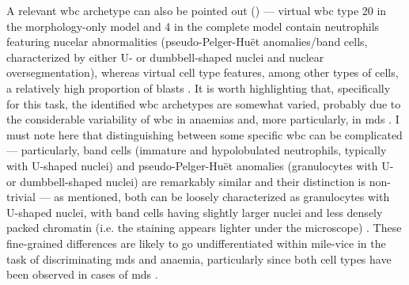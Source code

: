 \begin{figure}[!ht]
    \label{fig:mile-vice-vcq-so-disease-detection}
\end{figure}

\begin{figure}[!ht]
    \label{fig:rbc-disease-detection-examples}
\end{figure}

A relevant \ac{wbc} archetype can also be pointed out () --- virtual \ac{wbc} type 20 in the morphology-only model and 4 in the complete model contain neutrophils featuring nucelar abnormalities (pseudo-Pelger-Huët anomalies/band cells, characterized by either U- or dumbbell-shaped nuclei \cite{Bain2005-uq} and nuclear oversegmentation), whereas virtual cell type features, among other types of cells, a relatively high proportion of blasts . It is worth highlighting that, specifically for this task, the identified \ac{wbc} archetypes are somewhat varied, probably due to the considerable variability of \ac{wbc} in anaemias and, more particularly, in \ac{mds} \cite{Bain2005-uq,Bain2014-oc}. I must note here that distinguishing between some specific \ac{wbc} can be complicated --- particularly, band cells (immature and hypolobulated neutrophils, typically with U-shaped nuclei) and pseudo-Pelger-Huët anomalies (granulocytes with U- or dumbbell-shaped nuclei) are remarkably similar and their distinction is non-trivial --- as mentioned, both can be loosely characterized as granulocytes with U-shaped nuclei, with band cells having slightly larger nuclei and less densely packed chromatin (i.e. the staining appears lighter under the microscope) \cite{Colella2012-so}. These fine-grained differences are likely to go undifferentiated within \ac{mile-vice} in the task of discriminating \ac{mds} and anaemia, particularly since both cell types have been observed in cases of \ac{mds} \cite{Davey1988-zn,Cunningham1995-pc}.


